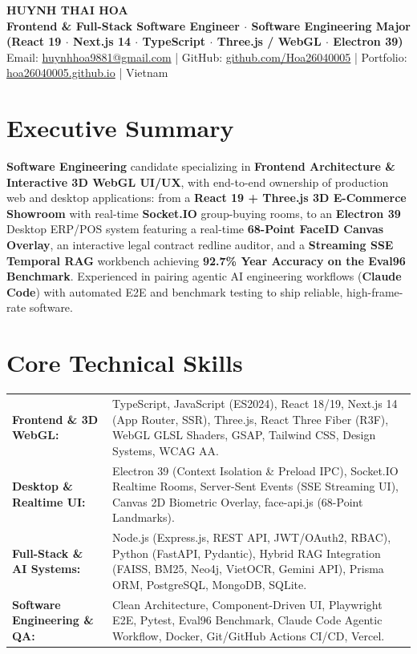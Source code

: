 \documentclass[10pt,a4paper]{article}
\begin{document}
\begin{center}
  {\Large \textbf{HUYNH THAI HOA}} \\[2pt]
  {\small \textbf{Frontend \& Full-Stack Software Engineer $\cdot$ Software Engineering Major (React 19 $\cdot$ Next.js 14 $\cdot$ TypeScript $\cdot$ Three.js / WebGL $\cdot$ Electron 39)}} \\[2pt]
  {\footnotesize
    Email: \href{mailto:huynhhoa9881@gmail.com}{huynhhoa9881@gmail.com} \quad|\quad
    GitHub: \href{https://github.com/Hoa26040005}{github.com/Hoa26040005} \quad|\quad
    Portfolio: \href{https://hoa26040005.github.io}{hoa26040005.github.io} \quad|\quad
    Vietnam
  }
\end{center}

\section{Executive Summary}
{\footnotesize
\textbf{Software Engineering} candidate specializing in \textbf{Frontend Architecture \& Interactive 3D WebGL UI/UX}, with end-to-end ownership of production web and desktop applications: from a \textbf{React 19 + Three.js 3D E-Commerce Showroom} with real-time \textbf{Socket.IO} group-buying rooms, to an \textbf{Electron 39} Desktop ERP/POS system featuring a real-time \textbf{68-Point FaceID Canvas Overlay}, an interactive legal contract redline auditor, and a \textbf{Streaming SSE Temporal RAG} workbench achieving \textbf{92.7\% Year Accuracy on the Eval96 Benchmark}. Experienced in pairing agentic AI engineering workflows (\textbf{Claude Code}) with automated E2E and benchmark testing to ship reliable, high-frame-rate software.
}

\section{Core Technical Skills}
{\footnotesize
\renewcommand{\arraystretch}{1.12}
\begin{tabularx}{\textwidth}{@{}p{4.3cm}X@{}}
  \textbf{Frontend \& 3D WebGL:} & TypeScript, JavaScript (ES2024), React 18/19, Next.js 14 (App Router, SSR), Three.js, React Three Fiber (R3F), WebGL GLSL Shaders, GSAP, Tailwind CSS, Design Systems, WCAG AA. \\
  \textbf{Desktop \& Realtime UI:} & Electron 39 (Context Isolation \& Preload IPC), Socket.IO Realtime Rooms, Server-Sent Events (SSE Streaming UI), Canvas 2D Biometric Overlay, face-api.js (68-Point Landmarks). \\
  \textbf{Full-Stack \& AI Systems:} & Node.js (Express.js, REST API, JWT/OAuth2, RBAC), Python (FastAPI, Pydantic), Hybrid RAG Integration (FAISS, BM25, Neo4j, VietOCR, Gemini API), Prisma ORM, PostgreSQL, MongoDB, SQLite. \\
  \textbf{Software Engineering \& QA:} & Clean Architecture, Component-Driven UI, Playwright E2E, Pytest, Eval96 Benchmark, Claude Code Agentic Workflow, Docker, Git/GitHub Actions CI/CD, Vercel.
\end{tabularx}
}
\end{document}
